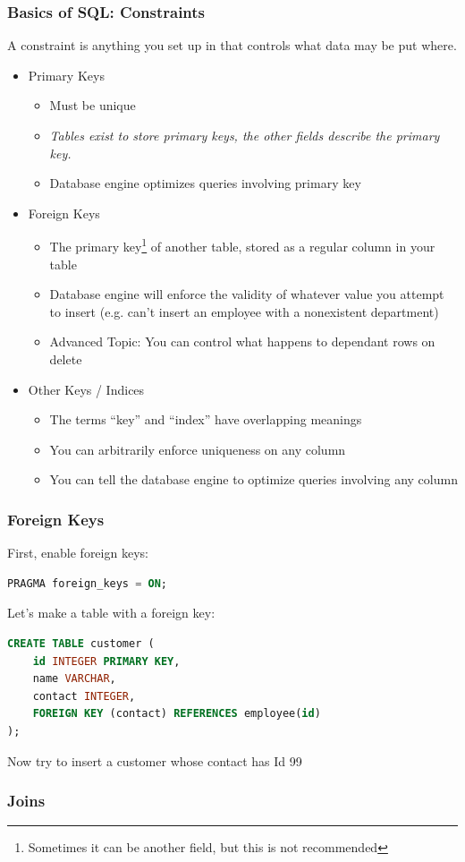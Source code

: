 \documentclass[aspectratio=169]{beamer}
\begin{document}
\begin{frame}
    \frametitle{Basics of SQL: Constraints}

    A constraint is anything you set up in that controls what data may be put where.
    \pause
    \begin{itemize}
        \item Primary Keys
        \begin{itemize}
            \item Must be unique
            \item \emph{Tables exist to store primary keys, the other fields describe the primary key.}
            \item Database engine optimizes queries involving primary key
        \end{itemize}
        \pause
        \item Foreign Keys
        \begin{itemize}
            \item The primary key\footnote[frame]{Sometimes it can be
            another field, but this is not recommended} of another table, stored
            as a regular column in your table
            \item Database engine will enforce the validity of whatever value
            you attempt to insert (e.g. can't insert an employee with a
            nonexistent department)
            \item Advanced Topic: You can control what happens to dependant rows
            on delete
        \end{itemize}
        \pause
        \item Other Keys / Indices
        \begin{itemize}
            \item The terms ``key'' and ``index'' have overlapping meanings
            \item You can arbitrarily enforce uniqueness on any column
            \item You can tell the database engine to optimize queries involving
            any column
        \end{itemize}
    \end{itemize}
\end{frame}
\begin{frame}[fragile]
    \frametitle{Foreign Keys}
    First, enable foreign keys:
    \begin{lstlisting}[language=SQL]
PRAGMA foreign_keys = ON;
    \end{lstlisting}
    Let's make a table with a foreign key:
    \begin{lstlisting}[language=SQL]
CREATE TABLE customer (
    id INTEGER PRIMARY KEY,
    name VARCHAR,
    contact INTEGER,
    FOREIGN KEY (contact) REFERENCES employee(id)
);
    \end{lstlisting}
    \pause
    Now try to insert a customer whose contact has Id 99
\end{frame}
\begin{frame}
    \frametitle{Joins}

    

\end{frame}
\end{document}
